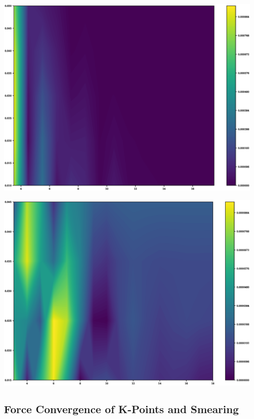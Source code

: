 \begin{center}
\includegraphics[scale=0.35]{appendix/dft_calibration/al/kpoints_energy_kpointconv_ry_colour}
\end{center}

\begin{center}
\includegraphics[scale=0.35]{appendix/dft_calibration/al/kpoints_energy_smearingconv_ry_colour}
\end{center}


\FloatBarrier
\subsection{Force Convergence of K-Points and Smearing}

